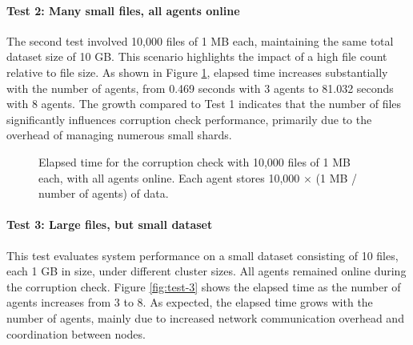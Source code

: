 \newpage
\paragraph{Test 2: Many small files, all agents online}

The second test involved 10,000 files of 1 MB each, maintaining the same total
dataset size of 10 GB. This scenario highlights the impact of a high file count
relative to file size. As shown in Figure \ref{fig:test-2}, elapsed time
increases substantially with the number of agents, from 0.469 seconds with 3
agents to 81.032 seconds with 8 agents. The growth compared to Test 1
indicates that the number of files significantly influences corruption check
performance, primarily due to the overhead of managing numerous small shards.

\begin{figure}[!ht]
\centering
{}
\caption{Elapsed time for the corruption check with 10,000 files of 1 MB each,
    with all agents online. Each agent stores 10,000 $\times$ (1 MB / number of agents) of data.}
\label{fig:test-2}
\end{figure}

\newpage
\paragraph{Test 3: Large files, but small dataset}

This test evaluates system performance on a small dataset consisting of 10 files, each 1 GB in size, under different cluster sizes. All agents remained online during the corruption check. Figure \ref{fig:test-3} shows the elapsed time as the number of agents increases from 3 to 8. As expected, the elapsed time grows with the number of agents, mainly due to increased network communication overhead and coordination between nodes.

